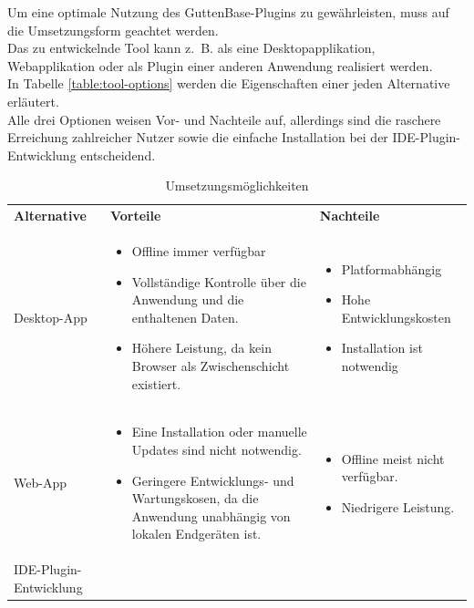 Um eine optimale Nutzung des GuttenBase-Plugins zu gewährleisten, muss auf die Umsetzungsform geachtet werden.\\
Das zu entwickelnde Tool kann z. B. als eine Desktopapplikation, Webapplikation oder als Plugin einer anderen Anwendung realisiert werden.\\
In Tabelle \ref{table:tool-options} werden die Eigenschaften einer jeden Alternative erläutert.\\
Alle drei Optionen weisen Vor- und Nachteile auf, allerdings sind die raschere Erreichung zahlreicher Nutzer sowie die einfache Installation bei der IDE-Plugin-Entwicklung entscheidend.
\begin{table}
	\centering
	\caption{Umsetzungsmöglichkeiten}
	\begin{tabular}{ |p{3cm}|p{6cm}|p{6cm}| }
		\hline
		\textbf{Alternative} & \textbf{Vorteile} &  \textbf{Nachteile}  \\
		Desktop-App & 
		\begin{itemize}
			\item Offline immer verfügbar
			\item Vollständige Kontrolle über die Anwendung und die enthaltenen Daten.
			\item Höhere Leistung, da kein Browser als Zwischenschicht existiert.
		\end{itemize}& 
		\begin{itemize}
			\item Platformabhängig
			\item Hohe Entwicklungskosten
			\item Installation ist notwendig
		\end{itemize} \\
		\hline
		Web-App &
		
		\begin{itemize}
			\item Eine Installation oder manuelle Updates sind nicht notwendig. 
			\item Geringere Entwicklungs- und Wartungskosen, da die Anwendung unabhängig von lokalen Endgeräten ist.
		\end{itemize} &
		
		\begin{itemize}
			\item Offline meist nicht verfügbar.
			\item Niedrigere Leistung.
		\end{itemize} \\
		\hline
		IDE-Plugin-Entwicklung &
		

\end{tabular}
\end{table}
